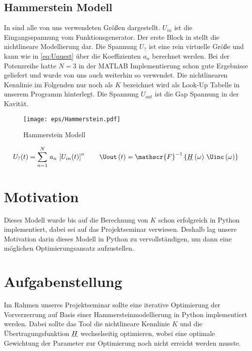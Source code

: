 \documentclass[../Report.tex]{subfiles}
\begin{document}
\subsection{Hammerstein Modell}
\label{subsec:einf.modell_BB.hammerstein}
In  sind alle von uns verwendeten Größen dargestellt. $U_{in}$ ist die Eingangsspannung vom Funktionsgenerator. Der erste Block in  stellt die nichtlineare Modellierung dar. Die Spannung $U_{?}$ ist eine rein virtuelle Größe und kann wie in \ref{eq:Uquest} über die Koeffizienten $a_n$ berechnet werden. Bei der Potenzreihe hatte $N = 3$ in der MATLAB Implementierung schon gute Ergebnisse geliefert und wurde von uns auch weiterhin so verwendet. Die nichtlinearen Kennlinie im Folgenden nur noch als $K$ bezeichnet wird als Look-Up Tabelle in unserem Programm hinterlegt. Die Spannung $U_{out}$ ist die Gap Spannung in der Kavität.
\begin{figure}[H]
	\centering
	\texttt{[image: eps/Hammerstein.pdf]}
	\caption{Hammerstein Modell}
  	\label{fig:Hammerstein}
\end{figure}
\begin{align}
	U_?(t)=\sum_{n=1}^N \, a_n \, \left[ U_{in}(t) \right]^n
	\label{eq:Uquest}
	\qquad
	\Uout \oft = \mathscr{F}^{-1} \left\{ \Hcompl \ofomega \, \Uinc \ofomega \right\}
\end{align}


\section{Motivation}
\label{sec:einf.motivation}
Dieses Modell wurde bis auf die Berechnung von $K$ schon erfolgreich in Python implementiert, dabei sei auf das Projektseminar \cite{PJS_Denys} verwiesen. Deshalb lag unsere Motivation darin dieses Modell in Python zu vervollständigen, um dann eine möglichen Optimierungsansatz aufzustellen.


\section{Aufgabenstellung}
\label{sec:einf.problem}
Im Rahmen unseres Projektseminar sollte eine iterative Optimierung der Vorverzerrung auf Basis einer Hammersteinmodellierung in Python implementiert werden. Dabei sollte das Tool die nichtlineare Kennlinie $K$ und die Übertragungsfunktion $\underline{H}$ wechselseitig optimieren, wobei eine optimale Gewichtung der Parameter zur Optimierung noch nicht erreicht werden musste.
\end{document}
